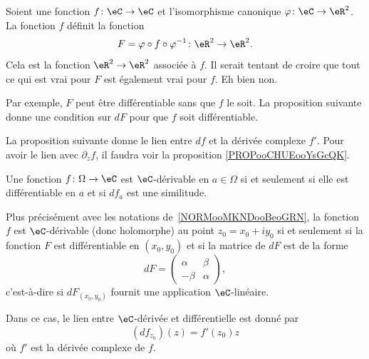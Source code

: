 \begin{normaltext}      \label{NORMooMKNDooBeoGRN}
	Soient une fonction \( f\colon \eC\to \eC\) et l'isomorphisme canonique \( \varphi\colon \eC\to \eR^2\). La fonction \( f\) définit la fonction
	\begin{equation}
		F=\varphi \circ f\circ \varphi^{-1}\colon \eR^2\to \eR^2.
	\end{equation}
	Cela est la fonction \( \eR^2\to \eR^2\) associée à \( f\). Il serait tentant de croire que tout ce qui est vrai pour \( F\) est également vrai pour \( f\). Eh bien non.

	Par exemple, \( F\) peut être différentiable sans que \( f\) le soit. La proposition suivante donne une condition sur \( dF\) pour que \( f\) soit différentiable.
\end{normaltext}

La proposition suivante donne le lien entre \( df\) et la dérivée complexe \( f'\). Pour avoir le lien avec \( \partial_zf\), il faudra voir la proposition \ref{PROPooCHUEooYsGcQK}.
\begin{proposition}     \label{PropKJUDooJfqgYS}
	Une fonction \( f\colon \Omega\to \eC\) est \( \eC\)-dérivable en \( a\in\Omega\) si et seulement si elle est différentiable en \( a\) et si \( df_a\) est une similitude.

	Plus précisément avec les notations de~\ref{NORMooMKNDooBeoGRN}, la fonction \( f\) est \( \eC\)-dérivable (donc holomorphe) au point \( z_0=x_0+iy_0\) si et seulement si la fonction \( F\) est différentiable en \( (x_0,y_0)\) et si la matrice de \( dF\) est de la forme
	\begin{equation}        \label{EQooWZGKooLDEHGr}
		dF=\begin{pmatrix}
			\alpha & \beta  \\
			-\beta & \alpha
		\end{pmatrix},
	\end{equation}
	c'est-à-dire si \( dF_{(x_0,y_0)}\) fournit une application \( \eC\)-linéaire.

	Dans ce cas, le lien entre \( \eC\)-dérivée et différentielle est donné par
	\begin{equation}        \label{EqPAEFooYNhYpz}
		(df_{z_0})(z)=f'(z_0)z
	\end{equation}
	où \( f'\) est la dérivée complexe de \( f\).
\end{proposition}

